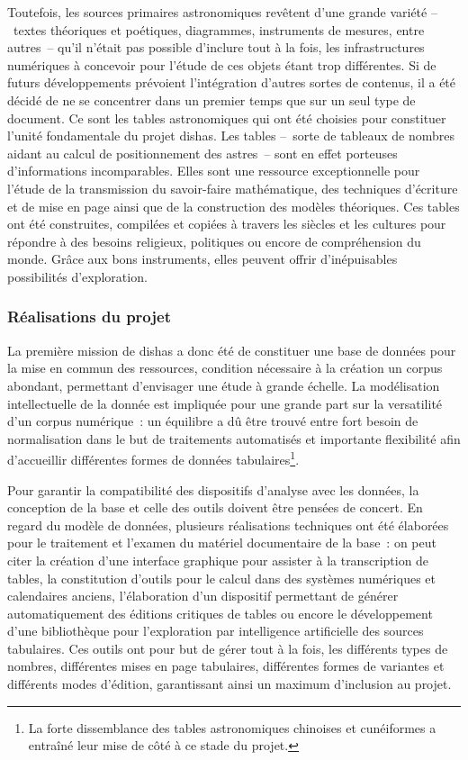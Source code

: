 \documentclass[a4paper,12pt,twoside]{book}
\newcommand{\dishas}{\gls{dishas}\xspace}
\begin{document}
Toutefois, les sources primaires astronomiques revêtent d'une grande variété –~textes théoriques et poétiques, diagrammes, instruments de mesures, entre autres~– qu'il n'était pas possible d'inclure tout à la fois, les infrastructures numériques à concevoir pour l'étude de ces objets étant trop différentes. Si de futurs développements prévoient l'intégration d'autres sortes de contenus, il a été décidé de ne se concentrer dans un premier temps que sur un seul type de document. Ce sont les tables astronomiques qui ont été choisies pour constituer l'unité fondamentale du projet \dishas. Les tables –~sorte de tableaux de nombres aidant au calcul de positionnement des astres~– sont en effet porteuses d'informations incomparables. Elles sont une ressource exceptionnelle pour l'étude de la transmission du savoir-faire mathématique, des techniques d'écriture et de mise en page ainsi que de la construction des modèles théoriques. Ces tables ont été construites, compilées et copiées à travers les siècles et les cultures pour répondre à des besoins religieux, politiques ou encore de compréhension du monde. Grâce aux bons instruments, elles peuvent offrir d'inépuisables possibilités d'exploration.

			\subsubsection{Réalisations du projet}
La première mission de \dishas a donc été de constituer une base de données pour la mise en commun des ressources, condition nécessaire à la création un corpus abondant, permettant d'envisager une étude à grande échelle. La modélisation intellectuelle de la donnée est impliquée pour une grande part sur la versatilité d'un corpus numérique~: un équilibre a dû être trouvé entre fort besoin de normalisation dans le but de traitements automatisés et importante flexibilité afin d'accueillir différentes formes de données tabulaires\footnote{La forte dissemblance des tables astronomiques chinoises et cunéiformes a entraîné leur mise de côté à ce stade du projet.}.

Pour garantir la compatibilité des dispositifs d'analyse avec les données, la conception de la base et celle des outils doivent être pensées de concert. En regard du modèle de données, plusieurs réalisations techniques ont été élaborées pour le traitement et l'examen du matériel documentaire de la base~: on peut citer la création d'une interface graphique pour assister à la transcription de tables, la constitution d'outils pour le calcul dans des systèmes numériques et calendaires anciens, l'élaboration d'un dispositif permettant de générer automatiquement des éditions critiques de tables ou encore le développement d'une bibliothèque pour l'exploration par intelligence artificielle des sources tabulaires. Ces outils ont pour but de gérer tout à la fois, les différents types de nombres, différentes mises en page tabulaires, différentes formes de variantes et différents modes d'édition, garantissant ainsi un maximum d'inclusion au projet.
\end{document}
